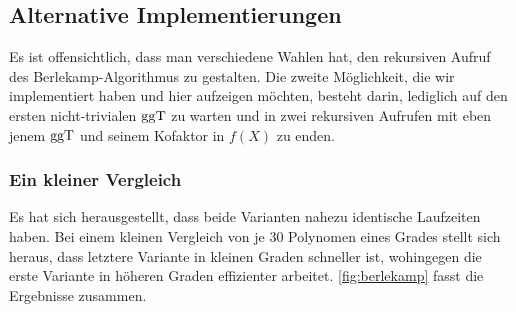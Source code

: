 \subsection{Alternative Implementierungen}

Es ist offensichtlich, dass man verschiedene Wahlen hat, den rekursiven Aufruf
des Berlekamp-Algorithmus zu gestalten. Die zweite Möglichkeit, die wir
implementiert haben und hier aufzeigen möchten, besteht darin, lediglich auf
den ersten nicht-trivialen $\operatorname{ggT}$ zu warten und in zwei rekursiven Aufrufen mit
eben jenem $\operatorname{ggT}$ und seinem Kofaktor in $f(X)$ zu enden.


\subsubsection{Ein kleiner Vergleich}

Es hat sich herausgestellt, dass beide Varianten nahezu identische Laufzeiten
haben. Bei einem kleinen Vergleich von je 30 Polynomen eines Grades
stellt sich heraus, dass letztere Variante in kleinen Graden schneller ist,
wohingegen die erste Variante in höheren Graden effizienter arbeitet.
\autoref{fig:berlekamp} fasst die Ergebnisse zusammen.

